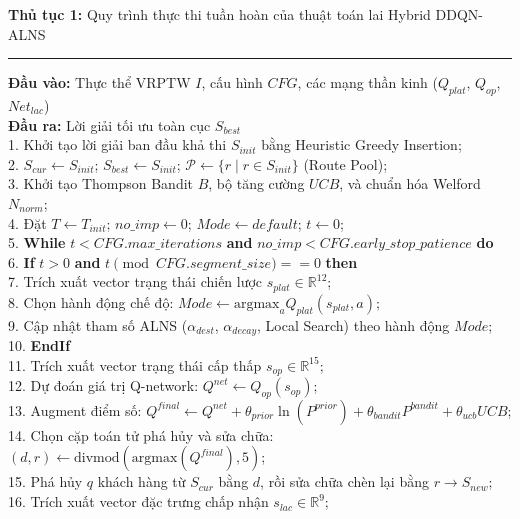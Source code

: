 \documentclass[13pt,a4paper]{extarticle}
\begin{document}
\begingroup
\fontsize{11pt}{14pt}\selectfont
\begin{tabbing}
\textbf{Thủ tục 1:} Quy trình thực thi tuần hoàn của thuật toán lai Hybrid DDQN-ALNS \\
\rule{\linewidth}{0.4pt}
\textbf{Đầu vào:} Thực thể VRPTW $I$, cấu hình $CFG$, các mạng thần kinh ($Q_{plat}$, $Q_{op}$, $Net_{lac}$)\\
\textbf{Đầu ra:} Lời giải tối ưu toàn cục $S_{best}$\\
1. Khởi tạo lời giải ban đầu khả thi $S_{init}$ bằng Heuristic Greedy Insertion; \\
2. $S_{cur} \leftarrow S_{init}$; $S_{best} \leftarrow S_{init}$; $\mathcal{P} \leftarrow \{r \mid r \in S_{init}\}$ (Route Pool); \\
3. Khởi tạo Thompson Bandit $B$, bộ tăng cường $UCB$, và chuẩn hóa Welford $N_{norm}$; \\
4. Đặt $T \leftarrow T_{init}$; $no\_imp \leftarrow 0$; $Mode \leftarrow default$; $t \leftarrow 0$; \\
5. \textbf{While} $t < CFG.max\_iterations$ \textbf{and} $no\_imp < CFG.early\_stop\_patience$ \textbf{do} \\
6. \qquad \textbf{If} $t > 0$ \textbf{and} $t \pmod{CFG.segment\_size} == 0$ \textbf{then} \\
7. \qquad\qquad Trích xuất vector trạng thái chiến lược $s_{plat} \in \mathbb{R}^{12}$; \\
8. \qquad\qquad Chọn hành động chế độ: $Mode \leftarrow \text{argmax}_{a} Q_{plat}(s_{plat}, a)$; \\
9. \qquad\qquad Cập nhật tham số ALNS ($\alpha_{dest}$, $\alpha_{decay}$, Local Search) theo hành động $Mode$; \\
10. \qquad \textbf{EndIf} \\
11. \qquad Trích xuất vector trạng thái cấp thấp $s_{op} \in \mathbb{R}^{15}$; \\
12. \qquad Dự đoán giá trị Q-network: $Q^{net} \leftarrow Q_{op}(s_{op})$; \\
13. \qquad Augment điểm số: $Q^{final} \leftarrow Q^{net} + \theta_{prior} \ln(P^{prior}) + \theta_{bandit} P^{bandit} + \theta_{ucb} UCB$; \\
14. \qquad Chọn cặp toán tử phá hủy và sửa chữa: $(d, r) \leftarrow \text{divmod}(\text{argmax}(Q^{final}), 5)$; \\
15. \qquad Phá hủy $q$ khách hàng từ $S_{cur}$ bằng $d$, rồi sửa chữa chèn lại bằng $r \to S_{new}$; \\
16. \qquad Trích xuất vector đặc trưng chấp nhận $s_{lac} \in \mathbb{R}^9$; \\

\end{tabbing}
\end{document}
